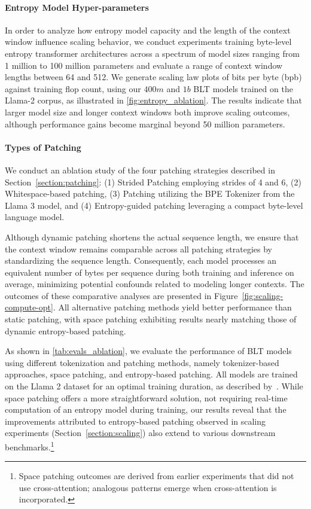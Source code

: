 \paragraph{Entropy Model Hyper-parameters} In order to analyze how entropy model capacity and the length of the context window influence scaling behavior, we conduct experiments training byte-level entropy transformer architectures across a spectrum of model sizes ranging from 1 million to 100 million parameters and evaluate a range of context window lengths between 64 and 512. We generate scaling law plots of bits per byte (bpb) against training flop count, using our $400m$ and $1b$ {\textsc BLT} models trained on the Llama-2 corpus, as illustrated in \autoref{fig:entropy_ablation}. The results indicate that larger model size and longer context windows both improve scaling outcomes, although performance gains become marginal beyond 50 million parameters.

\paragraph{Types of Patching}

We conduct an ablation study of the four patching strategies described in Section~\ref{section:patching}: (1) Strided Patching employing strides of 4 and 6, (2) Whitespace-based patching, (3) Patching utilizing the BPE Tokenizer from the Llama 3 model, and (4) Entropy-guided patching leveraging a compact byte-level language model.

Although dynamic patching shortens the actual sequence length, we ensure that the context window remains comparable across all patching strategies by standardizing the sequence length. Consequently, each model processes an equivalent number of bytes per sequence during both training and inference on average, minimizing potential confounds related to modeling longer contexts. The outcomes of these comparative analyses are presented in Figure~\ref{fig:scaling-compute-opt}. All alternative patching methods yield better performance than static patching, with space patching exhibiting results nearly matching those of dynamic entropy-based patching.

As shown in \autoref{tab:evals_ablation}, we evaluate the performance of {\textsc BLT} models using different tokenization and patching methods, namely tokenizer-based approaches, space patching, and entropy-based patching. All models are trained on the Llama 2 dataset for an optimal training duration, as described by~\citet{dubey2024llama}. While space patching offers a more straightforward solution, not requiring real-time computation of an entropy model during training, our results reveal that the improvements attributed to entropy-based patching observed in scaling experiments (Section~\ref{section:scaling}) also extend to various downstream benchmarks.\footnote{Space patching outcomes are derived from earlier experiments that did not use cross-attention; analogous patterns emerge when cross-attention is incorporated.}

